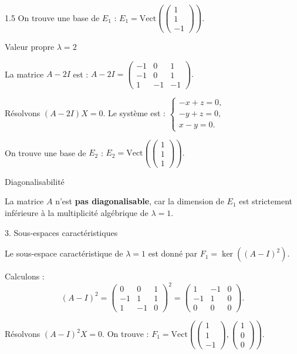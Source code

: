 \documentclass[12pt]{article}
\begin{document}
\begin{spacing}{1.5}
On trouve une base de $E_1$ :
$
E_1 = \mathrm{Vect}\left(\begin{pmatrix} 1 \\ 1 \\ -1 \end{pmatrix}\right).
$

Valeur propre $\lambda = 2$

La matrice $A - 2I$ est :
$
A - 2I = 
\begin{pmatrix}
-1 & 0 & 1 \\ 
-1 & 0 & 1 \\ 
1 & -1 & -1
\end{pmatrix}.
$

Résolvons $(A - 2I)X = 0$. Le système est :
$
\begin{cases}
-x + z = 0, \\
-y + z = 0, \\
x - y = 0.
\end{cases}
$

On trouve une base de $E_2$ :
$
E_2 = \mathrm{Vect}\left(\begin{pmatrix} 1 \\ 1 \\ 1 \end{pmatrix}\right).
$

Diagonalisabilité

La matrice $A$ n'est \textbf{pas diagonalisable}, car la dimension de $E_1$ est strictement inférieure à la multiplicité algébrique de $\lambda = 1$.

3. Sous-espaces caractéristiques

Le sous-espace caractéristique de $\lambda = 1$ est donné par $F_1 = \ker((A - I)^2)$.

Calculons :
\[
(A - I)^2 = 
\begin{pmatrix}
0 & 0 & 1 \\ 
-1 & 1 & 1 \\ 
1 & -1 & 0
\end{pmatrix}^2 = 
\begin{pmatrix}
1 & -1 & 0 \\ 
-1 & 1 & 0 \\ 
0 & 0 & 0
\end{pmatrix}.
\]

Résolvons $(A - I)^2X = 0$. On trouve :
$
F_1 = \mathrm{Vect}\left(\begin{pmatrix} 1 \\ 1 \\ -1 \end{pmatrix}, \begin{pmatrix} 1 \\ 0 \\ 0 \end{pmatrix}\right).
$


\end{spacing}
\end{document}

